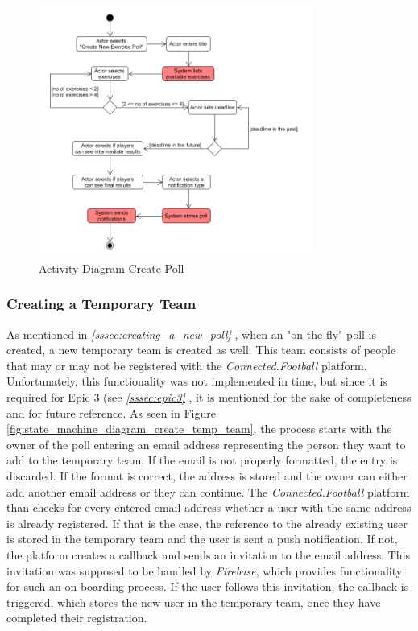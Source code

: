 \begin{figure}[H]
    \begin{center}
        \includegraphics[width=0.8\textwidth]{images/diagrams/activity_diagrams/ActivityDiagram_CreateExercisePoll.png}
        \caption{Activity Diagram Create Poll}
        \label{fig:activity_diagram_create_poll}
    \end{center}
\end{figure}

\subsubsection{Creating a Temporary Team}
\label{sssec:creating_temp_team}

As mentioned in \textit{\ref{sssec:creating_a_new_poll} }, when an "on-the-fly" poll is created, a new temporary team is created as well. This team consists of people that may or may not be registered with the \textit{Connected.Football} platform. Unfortunately, this functionality was not implemented in time, but since it is required for Epic 3 (see \textit{\ref{sssec:epic3} }, it is mentioned for the sake of completeness and for future reference.
\newline
As seen in Figure \ref{fig:state_machine_diagram_create_temp_team}, the process starts with the owner of the poll entering an email address representing the person they want to add to the temporary team. If the email is not properly formatted, the entry is discarded. If the format is correct, the address is stored and the owner can either add another email address or they can continue.
\newline
The \textit{Connected.Football} platform than checks for every entered email address whether a user with the same address is already registered. If that is the case, the reference to the already existing user is stored in the temporary team and the user is sent a push notification. If not, the platform creates a callback and sends an invitation to the email address. This invitation was supposed to be handled by \textit{Firebase}, which provides functionality for such an on-boarding process. If the user follows this invitation, the callback is triggered, which stores the new user in the temporary team, once they have completed their registration.

